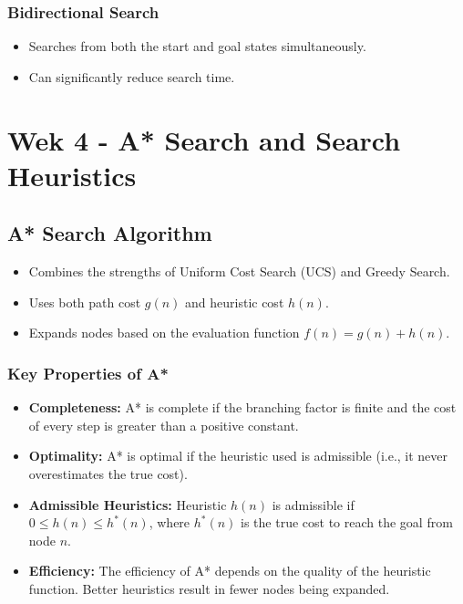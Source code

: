 \documentclass[8pt]{article}
\begin{document}
\subsubsection{Bidirectional Search}
\begin{itemize}
    \item Searches from both the start and goal states simultaneously.
    \item Can significantly reduce search time.
\end{itemize}

\newpage
\section{Wek 4 - A* Search and Search Heuristics}
\subsection{A* Search Algorithm}
\begin{itemize}
    \item Combines the strengths of Uniform Cost Search (UCS) and Greedy Search.
    \item Uses both path cost \(g(n)\) and heuristic cost \(h(n)\).
    \item Expands nodes based on the evaluation function \(f(n) = g(n) + h(n)\).
\end{itemize}

\subsubsection{Key Properties of A*}
\begin{itemize}
    \item \textbf{Completeness:} A* is complete if the branching factor is finite and the cost of every step is greater than a positive constant.
    \item \textbf{Optimality:} A* is optimal if the heuristic used is admissible (i.e., it never overestimates the true cost).
    \item \textbf{Admissible Heuristics:} Heuristic \(h(n)\) is admissible if \(0 \leq h(n) \leq h^*(n)\), where \(h^*(n)\) is the true cost to reach the goal from node \(n\).
    \item \textbf{Efficiency:} The efficiency of A* depends on the quality of the heuristic function. Better heuristics result in fewer nodes being expanded.
\end{itemize}
\end{document}
